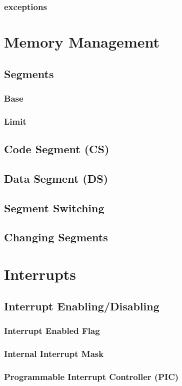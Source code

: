 \documentclass[oneside, a4paper]{memoir}
\begin{document}
\subsection{exceptions}

\chapter{Memory Management}
\section{Segments}
\subsection{Base}
\subsection{Limit}
\section{Code Segment (CS)}
\section{Data Segment (DS)}
\section{Segment Switching}
\section{Changing Segments}

\chapter{Interrupts}
\section{Interrupt Enabling/Disabling}
\subsection{Interrupt Enabled Flag}
\subsection{Internal Interrupt Mask}
\subsection{Programmable Interrupt Controller (PIC)}
\end{document}
